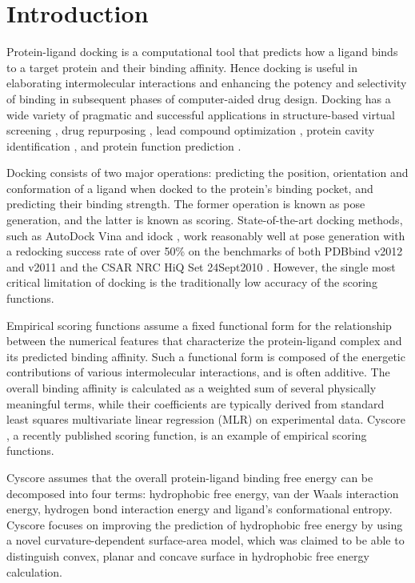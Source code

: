 \documentclass[journal=jacsat,manuscript=article]{achemso}
\begin{document}
\section{Introduction}

Protein-ligand docking is a computational tool that predicts how a ligand binds to a target protein and their binding affinity. Hence docking is useful in elaborating intermolecular interactions and enhancing the potency and selectivity of binding in subsequent phases of computer-aided drug design. Docking has a wide variety of pragmatic and successful applications in structure-based virtual screening \cite{1383}, drug repurposing \cite{1384}, lead compound optimization \cite{1385}, protein cavity identification \cite{1217}, and protein function prediction \cite{1386}.

Docking consists of two major operations: predicting the position, orientation and conformation of a ligand when docked to the protein's binding pocket, and predicting their binding strength. The former operation is known as pose generation, and the latter is known as scoring. State-of-the-art docking methods, such as AutoDock Vina \cite{595} and idock \cite{1153}, work reasonably well at pose generation with a redocking success rate of over 50\% \cite{1362} on the benchmarks of both PDBbind v2012 and v2011 \cite{529,530} and the CSAR NRC HiQ Set 24Sept2010 \cite{857,960}. However, the single most critical limitation of docking is the traditionally low accuracy of the scoring functions.

Empirical scoring functions assume a fixed functional form for the relationship between the numerical features that characterize the protein-ligand complex and its predicted binding affinity. Such a functional form is composed of the energetic contributions of various intermolecular interactions, and is often additive. The overall binding affinity is calculated as a weighted sum of several physically meaningful terms, while their coefficients are typically derived from standard least squares multivariate linear regression (MLR) on experimental data. Cyscore \cite{1372}, a recently published scoring function, is an example of empirical scoring functions.

Cyscore assumes that the overall protein-ligand binding free energy can be decomposed into four terms: hydrophobic free energy, van der Waals interaction energy, hydrogen bond interaction energy and ligand's conformational entropy. Cyscore focuses on improving the prediction of hydrophobic free energy by using a novel curvature-dependent surface-area model, which was claimed to be able to distinguish convex, planar and concave surface in hydrophobic free energy calculation.
\end{document}
